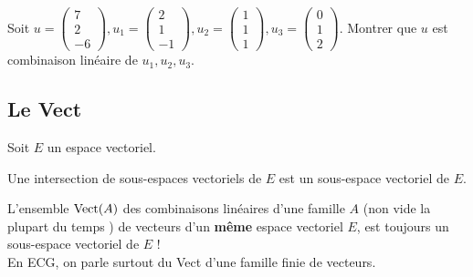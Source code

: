 \begin{exo}  %
	\vspace{2pt}
	Soit $u = \begin{pmatrix} 7 \\2\\-6\end{pmatrix}, u_1 = \begin{pmatrix} 2\\1\\-1 \end{pmatrix},u_2 = \begin{pmatrix} 1\\1\\1 \end{pmatrix}, u_3 = \begin{pmatrix}0 \\1 \\2 \end{pmatrix}$. Montrer que $u$ est combinaison linéaire de $u_1,u_2,u_3$.
\end{exo}


\subsection{Le \og Vect \fg}

Soit $E$ un espace vectoriel.


\Prop
{ 
	\label{intev}
	Une intersection de sous-espaces vectoriels de $E$ est un sous-espace vectoriel de $E$.
}


\Rem
{ 
	L'ensemble  $\textup{Vect}(A)$   des combinaisons linéaires d'une famille $A$ (non vide la plupart du temps \footnotemark) de vecteurs d'un \textbf{même} espace vectoriel $E$, est toujours un sous-espace vectoriel de $E$ ! \\
	En ECG, on parle surtout du \og Vect \fg d'une famille finie de vecteurs.
}

